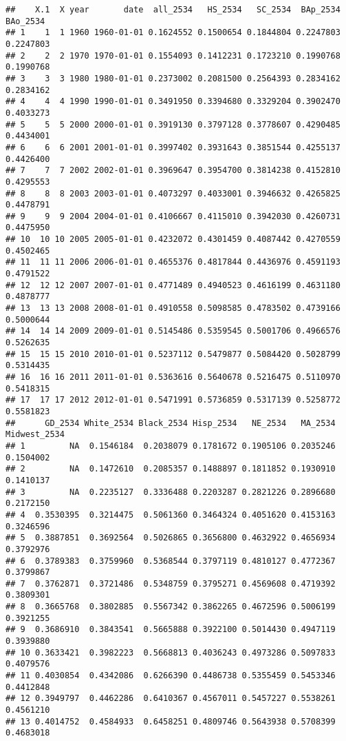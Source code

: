 \documentclass[
]{article}
\begin{document}
\begin{verbatim}
##    X.1  X year       date  all_2534   HS_2534   SC_2534  BAp_2534  BAo_2534
## 1    1  1 1960 1960-01-01 0.1624552 0.1500654 0.1844804 0.2247803 0.2247803
## 2    2  2 1970 1970-01-01 0.1554093 0.1412231 0.1723210 0.1990768 0.1990768
## 3    3  3 1980 1980-01-01 0.2373002 0.2081500 0.2564393 0.2834162 0.2834162
## 4    4  4 1990 1990-01-01 0.3491950 0.3394680 0.3329204 0.3902470 0.4033273
## 5    5  5 2000 2000-01-01 0.3919130 0.3797128 0.3778607 0.4290485 0.4434001
## 6    6  6 2001 2001-01-01 0.3997402 0.3931643 0.3851544 0.4255137 0.4426400
## 7    7  7 2002 2002-01-01 0.3969647 0.3954700 0.3814238 0.4152810 0.4295553
## 8    8  8 2003 2003-01-01 0.4073297 0.4033001 0.3946632 0.4265825 0.4478791
## 9    9  9 2004 2004-01-01 0.4106667 0.4115010 0.3942030 0.4260731 0.4475950
## 10  10 10 2005 2005-01-01 0.4232072 0.4301459 0.4087442 0.4270559 0.4502465
## 11  11 11 2006 2006-01-01 0.4655376 0.4817844 0.4436976 0.4591193 0.4791522
## 12  12 12 2007 2007-01-01 0.4771489 0.4940523 0.4616199 0.4631180 0.4878777
## 13  13 13 2008 2008-01-01 0.4910558 0.5098585 0.4783502 0.4739166 0.5000644
## 14  14 14 2009 2009-01-01 0.5145486 0.5359545 0.5001706 0.4966576 0.5262635
## 15  15 15 2010 2010-01-01 0.5237112 0.5479877 0.5084420 0.5028799 0.5314435
## 16  16 16 2011 2011-01-01 0.5363616 0.5640678 0.5216475 0.5110970 0.5418315
## 17  17 17 2012 2012-01-01 0.5471991 0.5736859 0.5317139 0.5258772 0.5581823
##      GD_2534 White_2534 Black_2534 Hisp_2534   NE_2534   MA_2534 Midwest_2534
## 1         NA  0.1546184  0.2038079 0.1781672 0.1905106 0.2035246    0.1504002
## 2         NA  0.1472610  0.2085357 0.1488897 0.1811852 0.1930910    0.1410137
## 3         NA  0.2235127  0.3336488 0.2203287 0.2821226 0.2896680    0.2172150
## 4  0.3530395  0.3214475  0.5061360 0.3464324 0.4051620 0.4153163    0.3246596
## 5  0.3887851  0.3692564  0.5026865 0.3656800 0.4632922 0.4656934    0.3792976
## 6  0.3789383  0.3759960  0.5368544 0.3797119 0.4810127 0.4772367    0.3799867
## 7  0.3762871  0.3721486  0.5348759 0.3795271 0.4569608 0.4719392    0.3809301
## 8  0.3665768  0.3802885  0.5567342 0.3862265 0.4672596 0.5006199    0.3921255
## 9  0.3686910  0.3843541  0.5665888 0.3922100 0.5014430 0.4947119    0.3939880
## 10 0.3633421  0.3982223  0.5668813 0.4036243 0.4973286 0.5097833    0.4079576
## 11 0.4030854  0.4342086  0.6266390 0.4486738 0.5355459 0.5453346    0.4412848
## 12 0.3949797  0.4462286  0.6410367 0.4567011 0.5457227 0.5538261    0.4561210
## 13 0.4014752  0.4584933  0.6458251 0.4809746 0.5643938 0.5708399    0.4683018

\end{verbatim}
\end{document}
